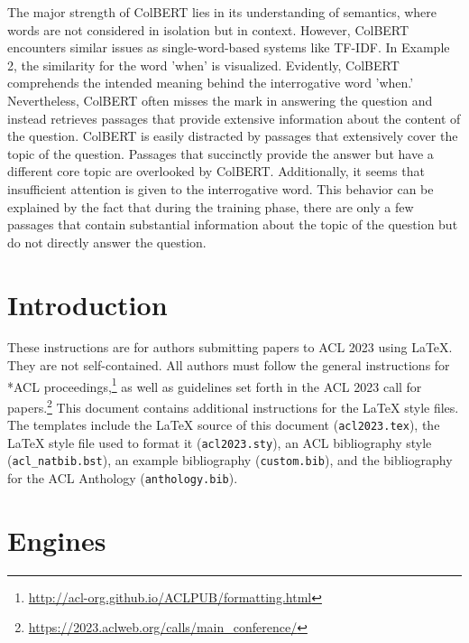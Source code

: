 \documentclass[11pt]{article}
\begin{document}
 The major strength of ColBERT lies in its understanding of semantics, where words are not considered in isolation but in context. However, ColBERT encounters similar issues as single-word-based systems like TF-IDF. In Example 2, the similarity for the word 'when' is visualized. Evidently, ColBERT comprehends the intended meaning behind the interrogative word 'when.' Nevertheless, ColBERT often misses the mark in answering the question and instead retrieves passages that provide extensive information about the content of the question. ColBERT is easily distracted by passages that extensively cover the topic of the question. Passages that succinctly provide the answer but have a different core topic are overlooked by ColBERT. Additionally, it seems that insufficient attention is given to the interrogative word.
 This behavior can be explained by the fact that during the training phase, there are only a few passages that contain substantial information about the topic of the question but do not directly answer the question.
 

\section{Introduction}

These instructions are for authors submitting papers to ACL 2023 using \LaTeX. They are not self-contained. All authors must follow the general instructions for *ACL proceedings,\footnote{\url{http://acl-org.github.io/ACLPUB/formatting.html}} as well as guidelines set forth in the ACL 2023 call for papers.\footnote{\url{https://2023.aclweb.org/calls/main_conference/}} This document contains additional instructions for the \LaTeX{} style files.
The templates include the \LaTeX{} source of this document (\texttt{acl2023.tex}),
the \LaTeX{} style file used to format it (\texttt{acl2023.sty}),
an ACL bibliography style (\texttt{acl\_natbib.bst}),
an example bibliography (\texttt{custom.bib}),
and the bibliography for the ACL Anthology (\texttt{anthology.bib}).

\section{Engines}
\end{document}
